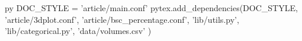 \usepackage[explicit]{titlesec}
%
\titlespacing{\section}{0em}{1.5em}{0.4em}
%
\titlespacing{\subsection}{0em}{1em}{0.2em}
%
\titlespacing{\subsubsection}{0em}{0.75em}{0em}

\usepackage[autoprint=false, gobble=auto, pyfuture=all]{pythontex} %
\usepackage{pgf} %


\begin{pythontexcustomcode}[begin]{py}
DOC_STYLE = 'article/main.conf'
pytex.add_dependencies(DOC_STYLE,
	'article/3dplot.conf',
	'article/bsc_percentage.conf',
	'lib/utils.py',
	'lib/categorical.py',
	'data/volumes.csv'
	)
\end{pythontexcustomcode}


\setlength{\columnsep}{7mm}

\newcommand{\niceus}{\texttt{\_}}

%

